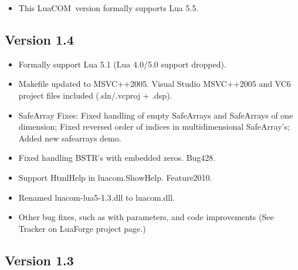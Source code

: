 \documentclass[11pt,a4paper,english]{report}
\newcommand{\techname}[1]{\mbox{#1}}
\newcommand{\luacom}{\techname{LuaCOM}}
\begin{document}
\begin{itemize}
\item This \luacom\ version formally supports Lua 5.5.
\end{itemize}

\subsection*{Version 1.4}

\begin{itemize}

\item Formally support Lua 5.1 (Lua 4.0/5.0 support dropped).

\item Makefile updated to MSVC++2005.  Visual Studio MSVC++2005 and VC6
  project files included (.sln/.vcproj + .dsp).

\item SafeArray Fixes:
  Fixed handling of empty SafeArrays and SafeArrays of one dimension;
  Fixed reversed order of indices in multidimensional SafeArray's;
  Added new safearrays demo.

\item Fixed handling BSTR's with embedded zeros. Bug428.

\item Support HtmlHelp in luacom.ShowHelp. Feature2010.

\item Renamed luacom-lua5-1.3.dll to luacom.dll.

\item Other bug fixes, such as with parameters, and code improvements
  (See Tracker on LuaForge project page.)

\end{itemize}

\subsection*{Version 1.3}
\end{document}
